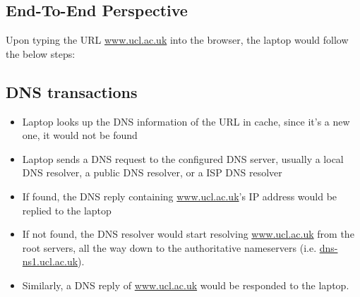 \documentclass[12pt,letterpaper]{article}
\begin{document}
\subsection{End-To-End Perspective}



Upon typing the URL \url{www.ucl.ac.uk} into the browser, the laptop would follow the below steps:

\subsection{DNS transactions}

\begin{itemize}
    \item Laptop looks up the DNS information of the URL in cache, since it's a new one, it would not be found
    \item Laptop sends a DNS request to the configured DNS server, usually a local DNS resolver, a public DNS resolver, or a ISP DNS resolver
    \item If found, the DNS reply containing \url{www.ucl.ac.uk}'s IP address would be replied to the laptop
    \item If not found, the DNS resolver would start resolving \url{www.ucl.ac.uk} from the root servers, all the way down to the authoritative nameservers (i.e. \url{dns-ns1.ucl.ac.uk}).
    \item Similarly, a DNS reply of \url{www.ucl.ac.uk} would be responded to the laptop.
\end{itemize}

\subsection{}
\end{document}
